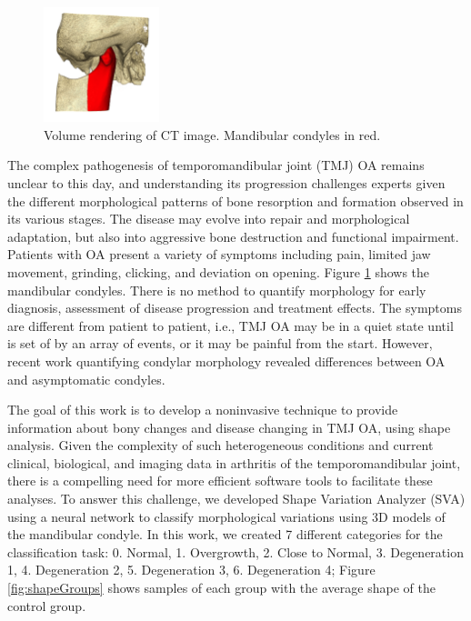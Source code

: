\documentclass[]{spie}  %
\begin{document}
\begin{figure}
    \centering
    \includegraphics[width=0.3\textwidth]{mandibular-condyles.png}
    \caption{Volume rendering of CT image. Mandibular condyles in red.}
    \label{fig:mandibular}
\end{figure}
The complex pathogenesis of temporomandibular joint (TMJ) OA remains unclear to this day, and understanding its progression challenges experts given the different morphological patterns of bone resorption and formation observed in its various stages. The disease may evolve into repair and morphological adaptation, but also into aggressive bone destruction and functional impairment. 
Patients with OA present a variety of symptoms including pain, limited jaw movement, grinding, clicking, 
and deviation on opening.
Figure \ref{fig:mandibular} shows the mandibular condyles. 
There is no method to quantify morphology for early diagnosis, assessment of disease progression and treatment effects. 
The symptoms are different from patient to patient, i.e., TMJ OA may be in a quiet state until is set of by an array 
of events, or it may be painful from the start. However, recent work quantifying condylar morphology revealed 
differences between OA and asymptomatic condyles\cite{cevidanes2010quantification}.

The goal of this work is to develop a noninvasive technique to provide information about bony changes and disease changing in TMJ OA, using shape analysis. 
Given the complexity of such heterogeneous conditions and current clinical, biological, and imaging data in arthritis of the temporomandibular joint, there is a compelling need for more efficient software tools to facilitate these analyses. To answer this challenge, we developed Shape Variation Analyzer (SVA) using a neural network to classify morphological variations using 3D models of the mandibular condyle. In this work, we created 7 different categories for the classification task: 0. Normal, 1. Overgrowth, 2. Close to Normal, 3. Degeneration 1, 4. Degeneration 2, 5. Degeneration 3, 6. Degeneration 4; Figure \ref{fig:shapeGroups} shows samples of each group with the average shape of the control group. 
\end{document}
